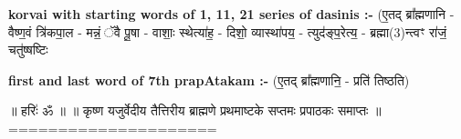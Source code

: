 \documentclass[17pt]{extarticle}
\begin{document}
        \textbf{korvai with starting words of 1, 11, 21 series of dasinis :-} \newline
        (ए॒तद् ब्रा᳚ह्मणानि - वैष्ण॒वं त्रि॑कपा॒ल - मन्नं॒ ॅवै पू॒षा - वाशाः॒ स्थेत्या॑ह॒ - दिशो॒ व्यास्था॑पय॒ - त्युद॑ङ्प॒रेत्य॒ - ब्रह्मा(3)न्त्वꣳ रा॑जं॒ चतु॑ष्षष्टिः \newline

        \textbf{first and last  word of 7th prapAtakam :-} \newline
        (ए॒तद् ब्रा᳚ह्मणानि॒ - प्रति॑ तिष्ठति) \newline 

       

        ॥ हरिः॑ ॐ ॥
॥ कृष्ण यजुर्वेदीय तैत्तिरीय ब्राह्मणे प्रथमाष्टके सप्तमः प्रपाठकः समाप्तः ॥
===================== \newline
        \pagebreak
        
        
        
\end{document}
